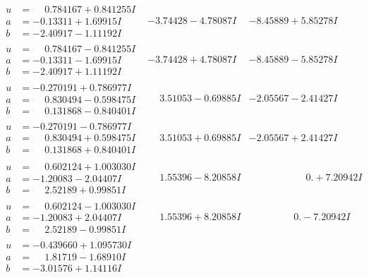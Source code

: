 \documentclass[1p]{elsarticle_modified}
\theoremstyle{definition}
\begin{document}
$$\begin{array}{c|c|c}
\begin{aligned}
u &= \phantom{-}0.784167 + 0.841255 I \\
a &= -0.13311 + 1.69915 I \\
b &= -2.40917 - 1.11192 I\end{aligned}
 & -3.74428 - 4.78087 I & -8.45889 + 5.85278 I \\ \hline\begin{aligned}
u &= \phantom{-}0.784167 - 0.841255 I \\
a &= -0.13311 - 1.69915 I \\
b &= -2.40917 + 1.11192 I\end{aligned}
 & -3.74428 + 4.78087 I & -8.45889 - 5.85278 I \\ \hline\begin{aligned}
u &= -0.270191 + 0.786977 I \\
a &= \phantom{-}0.830494 - 0.598475 I \\
b &= \phantom{-}0.131868 - 0.840401 I\end{aligned}
 & \phantom{-}3.51053 - 0.69885 I & -2.05567 - 2.41427 I \\ \hline\begin{aligned}
u &= -0.270191 - 0.786977 I \\
a &= \phantom{-}0.830494 + 0.598475 I \\
b &= \phantom{-}0.131868 + 0.840401 I\end{aligned}
 & \phantom{-}3.51053 + 0.69885 I & -2.05567 + 2.41427 I \\ \hline\begin{aligned}
u &= \phantom{-}0.602124 + 1.003030 I \\
a &= -1.20083 - 2.04407 I \\
b &= \phantom{-}2.52189 + 0.99851 I\end{aligned}
 & \phantom{-}1.55396 - 8.20858 I & \phantom{-0.000000 -}0. + 7.20942 I \\ \hline\begin{aligned}
u &= \phantom{-}0.602124 - 1.003030 I \\
a &= -1.20083 + 2.04407 I \\
b &= \phantom{-}2.52189 - 0.99851 I\end{aligned}
 & \phantom{-}1.55396 + 8.20858 I & \phantom{-0.000000 } 0. - 7.20942 I \\ \hline\begin{aligned}
u &= -0.439660 + 1.095730 I \\
a &= \phantom{-}1.81719 - 1.68910 I \\
b &= -3.01576 + 1.14116 I\end{aligned}

\end{array}$$
\end{document}
